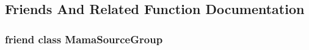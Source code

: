\subsection{Friends And Related Function Documentation}
\hypertarget{classWombat_1_1MamaSourceGroup_1_1iterator_a82189bc8b28cfa12074ed8afcd398469}{
\subsubsection[{MamaSourceGroup}]{\setlength{\rightskip}{0pt plus 5cm}friend class {\bf MamaSourceGroup}}}
\label{classWombat_1_1MamaSourceGroup_1_1iterator_a82189bc8b28cfa12074ed8afcd398469}
